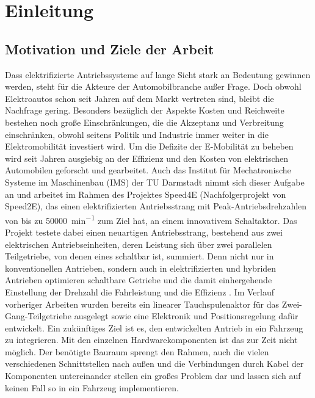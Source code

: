\chapter{Einleitung}\label{kap1}
\section{Motivation und Ziele der Arbeit}
Dass elektrifizierte Antriebssysteme auf lange Sicht stark an Bedeutung gewinnen werden, steht für die Akteure der Automobilbranche außer Frage. Doch obwohl Elektroautos schon seit Jahren auf dem Markt vertreten sind, bleibt die Nachfrage gering. Besonders bezüglich der Aspekte Kosten und Reichweite bestehen noch große Einschränkungen, die die Akzeptanz und Verbreitung einschränken, obwohl seitens Politik und Industrie immer weiter in die Elektromobilität investiert wird. Um die Defizite der E-Mobilität zu beheben wird seit Jahren ausgiebig an der Effizienz und den Kosten von elektrischen Automobilen geforscht und gearbeitet.
Auch das Institut für Mechatronische Systeme im Maschinenbau (IMS) der TU Darmstadt nimmt sich dieser Aufgabe an und arbeitet im Rahmen des Projektes Speed4E (Nachfolgerprojekt von Speed2E), das einen elektrifizierten Antriebsstrang mit Peak-Antriebsdrehzahlen von bis zu \SI{50 000}{min^{-1}} zum Ziel hat, an einem innovativem Schaltaktor. Das Projekt testete dabei einen neuartigen Antriebsstrang, bestehend aus zwei elektrischen Antriebseinheiten, deren Leistung sich über zwei parallelen Teilgetriebe, von denen eines schaltbar ist, summiert. Denn nicht nur in konventionellen Antrieben, sondern auch in elektrifizierten und hybriden Antrieben optimieren schaltbare Getriebe und die damit einhergehende Einstellung der Drehzahl die Fahrleistung und die Effizienz \cite{Tsch14}.
  Im Verlauf vorheriger Arbeiten wurden bereits ein linearer Tauchspulenaktor für das Zwei-Gang-Teilgetriebe ausgelegt sowie eine Elektronik und Positionsregelung dafür entwickelt. Ein zukünftiges Ziel ist es, den entwickelten Antrieb in ein Fahrzeug zu integrieren. Mit den einzelnen Hardwarekomponenten ist das zur Zeit nicht möglich. Der benötigte Bauraum sprengt den Rahmen, auch die vielen verschiedenen Schnittstellen nach außen und die Verbindungen durch Kabel der Komponenten untereinander stellen ein großes Problem dar und lassen sich auf keinen Fall so in ein Fahrzeug implementieren.

